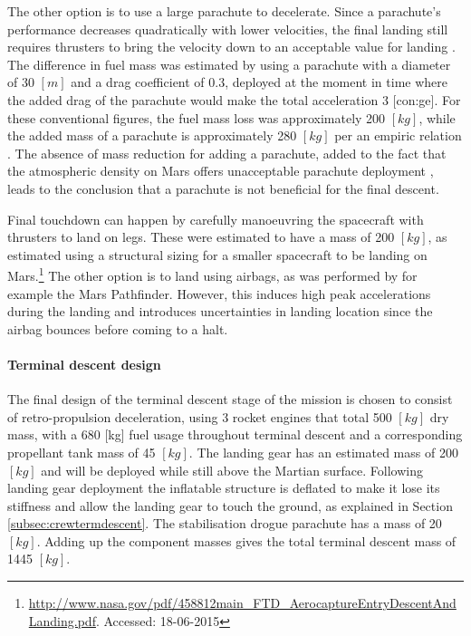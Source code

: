 The other option is to use a large parachute to decelerate. Since a parachute's performance decreases quadratically with lower velocities, the final landing still requires thrusters to bring the velocity down to an acceptable value for landing \cite{Braun2007}. The difference in fuel mass was estimated by using a parachute with a diameter of 30 $[m]$ and a drag coefficient of 0.3, deployed at the moment in time where the added drag of the parachute would make the total acceleration 3 [\gls{con:ge}]. For these conventional figures, the fuel mass loss was approximately 200 $[kg]$, while the added mass of a parachute is approximately 280 $[kg]$ per an empiric relation \cite{Anderson1969}. The absence of mass reduction for adding a parachute, added to the fact that the atmospheric density on Mars offers unacceptable parachute deployment \cite{Korzun2009}, leads to the conclusion that a parachute is not beneficial for the final descent.

Final touchdown can happen by carefully manoeuvring the spacecraft with thrusters to land on legs. These were estimated to have a mass of 200 $[kg]$, as estimated using a structural sizing for a smaller spacecraft to be landing on Mars.\footnote{\url{http://www.nasa.gov/pdf/458812main_FTD_AerocaptureEntryDescentAndLanding.pdf}. Accessed: 18-06-2015} The other option is to land using airbags, as was performed by for example the Mars Pathfinder. However, this induces high peak accelerations during the landing and introduces uncertainties in landing location since the airbag bounces before coming to a halt.

\paragraph{Terminal descent design}
The final design of the terminal descent stage of the mission is chosen to consist of retro-propulsion deceleration, using 3 rocket engines that total 500 $[kg]$ dry mass, with a 680 [kg] fuel usage throughout terminal descent and a corresponding propellant tank mass of 45 $[kg]$. The landing gear has an estimated mass of 200 $[kg]$ and will be deployed while still above the Martian surface. Following landing gear deployment the inflatable structure is deflated to make it lose its stiffness and allow the landing gear to touch the ground, as explained in Section \ref{subsec:crewtermdescent}. The stabilisation drogue parachute has a mass of 20 $[kg]$. Adding up the component masses gives the total terminal descent mass of 1445 $[kg]$.